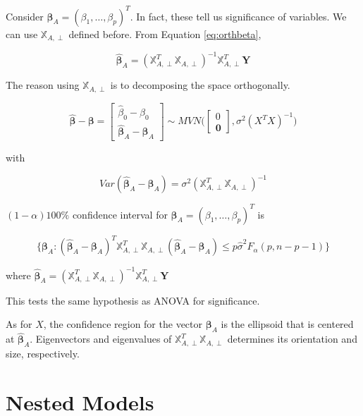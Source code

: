 \documentclass[]{book}
\theoremstyle{definition}
\theoremstyle{definition}
\theoremstyle{definition}
\theoremstyle{remark}
\let\BeginKnitrBlock\begin \let\EndKnitrBlock\end
\begin{document}
Consider \(\boldsymbol\beta_A = (\beta_1, \ldots, \beta_p)^T\). In fact, these tell us significance of variables. We can use \(\mathbb{X}_{A, \perp}\) defined before. From Equation \eqref{eq:orthbeta},

\[\boldsymbol{\hat\beta}_A = (\mathbb{X}_{A,\perp}^T\mathbb{X}_{A,\perp})^{-1}\mathbb{X}_{A,\perp}^T\mathbf{Y}\]

The reason using \(\mathbb{X}_{A, \perp}\) is to decomposing the space orthogonally.

\[
\boldsymbol{\hat\beta}- \boldsymbol\beta= \begin{bmatrix}
  \hat\beta_0 - \beta_0 \\ \hline
  \boldsymbol{\hat\beta}_A - \boldsymbol\beta_A
\end{bmatrix} \sim MVN\Bigg( \begin{bmatrix}
  0 \\ \hline
  \mathbf{0}
\end{bmatrix}, \sigma^2 (X^T X)^{-1} \bigg)
\]

with

\[Var(\boldsymbol{\hat\beta}_A - \boldsymbol\beta_A) = \sigma^2 (\mathbb{X}_{A, \perp}^T\mathbb{X}_{A, \perp})^{-1}\]

\BeginKnitrBlock{theorem}[Confidence region]
\protect\hypertarget{thm:bacr}{}{\label{thm:bacr} {} }\((1 - \alpha)100\%\) confidence interval for \(\boldsymbol\beta_A = (\beta_1, \ldots, \beta_p)^T\) is

\[\Big\{ \boldsymbol\beta_A : (\boldsymbol{\hat\beta}_A - \boldsymbol\beta_A)^T \mathbb{X}_{A, \perp}^T\mathbb{X}_{A, \perp} (\boldsymbol{\hat\beta}_A - \boldsymbol\beta_A) \le p \hat\sigma^2 F_{\alpha}(p, n - p - 1) \Big\}\]

where \(\boldsymbol{\hat\beta}_A = (\mathbb{X}_{A,\perp}^T\mathbb{X}_{A,\perp})^{-1}\mathbb{X}_{A,\perp}^T\mathbf{Y}\)
\EndKnitrBlock{theorem}

This tests the same hypothesis as ANOVA for significance.

\BeginKnitrBlock{remark}
{}As for \(X\), the confidence region for the vector \(\boldsymbol\beta_A\) is the ellipsoid that is centered at \(\boldsymbol{\hat\beta}_A\). Eigenvectors and eigenvalues of \(\mathbb{X}_{A, \perp}^T\mathbb{X}_{A, \perp}\) determines its orientation and size, respectively.
\EndKnitrBlock{remark}

\hypertarget{nested-models}{%
\section{Nested Models}\label{nested-models}}
\end{document}
